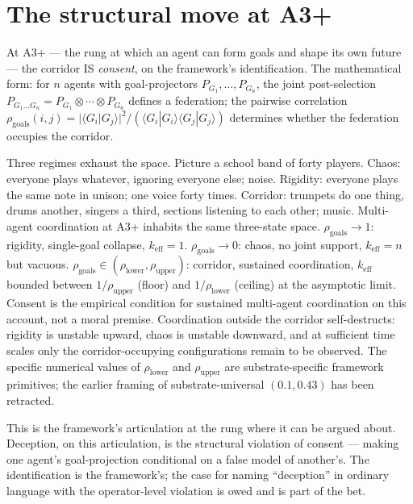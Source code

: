 \documentclass[11pt,a4paper]{article}
\newcommand{\keff}{k_{\text{eff}}}
\begin{document}
\section{The structural move at A3+}\label{sec:a3-structural}

At A3+ --- the rung at which an agent can form goals and shape its own future --- the corridor IS \emph{consent}, on the framework's identification. The mathematical form: for $n$ agents with goal-projectors $P_{G_1}, \ldots, P_{G_n}$, the joint post-selection $P_{G_1 \ldots G_n} = P_{G_1} \otimes \cdots \otimes P_{G_n}$ defines a federation; the pairwise correlation $\rho_{\text{goals}}(i, j) = |\langle G_i | G_j \rangle|^2 / (\langle G_i | G_i \rangle \langle G_j | G_j \rangle)$ determines whether the federation occupies the corridor.

Three regimes exhaust the space. Picture a school band of forty players. Chaos: everyone plays whatever, ignoring everyone else; noise. Rigidity: everyone plays the same note in unison; one voice forty times. Corridor: trumpets do one thing, drums another, singers a third, sections listening to each other; music. Multi-agent coordination at A3+ inhabits the same three-state space. $\rho_{\text{goals}} \to 1$: rigidity, single-goal collapse, $\keff = 1$. $\rho_{\text{goals}} \to 0$: chaos, no joint support, $\keff = n$ but vacuous. $\rho_{\text{goals}} \in (\rho_{\text{lower}}, \rho_{\text{upper}})$: corridor, sustained coordination, $\keff$ bounded between $1/\rho_{\text{upper}}$ (floor) and $1/\rho_{\text{lower}}$ (ceiling) at the asymptotic limit. Consent is the empirical condition for sustained multi-agent coordination on this account, not a moral premise. Coordination outside the corridor self-destructs: rigidity is unstable upward, chaos is unstable downward, and at sufficient time scales only the corridor-occupying configurations remain to be observed. The specific numerical values of $\rho_{\text{lower}}$ and $\rho_{\text{upper}}$ are substrate-specific framework primitives; the earlier framing of substrate-universal $(0.1, 0.43)$ has been retracted.

This is the framework's articulation at the rung where it can be argued about. Deception, on this articulation, is the structural violation of consent --- making one agent's goal-projection conditional on a false model of another's. The identification is the framework's; the case for naming ``deception'' in ordinary language with the operator-level violation is owed and is part of the bet.
\end{document}
